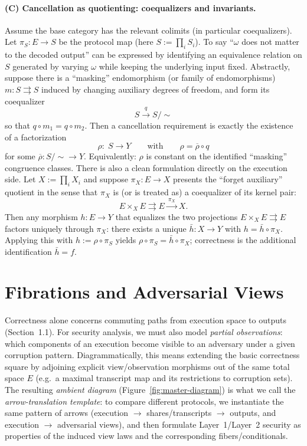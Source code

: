 \documentclass[11pt,a4paper]{article}
\theoremstyle{definition}
\theoremstyle{plain}
\begin{document}
\paragraph{(C) Cancellation as quotienting: coequalizers and invariants.}
Assume the base category has the relevant colimits (in particular coequalizers).
Let $\pi_S:E\to S$ be the protocol map (here $S:=\prod_i S_i$).
To say ``$\omega$ does not matter to the decoded output'' can be expressed by identifying an equivalence relation on $S$ generated by varying $\omega$ while keeping the underlying input fixed.
Abstractly, suppose there is a ``masking'' endomorphism (or family of endomorphisms) $m:S\rightrightarrows S$ induced by changing auxiliary degrees of freedom, and form its coequalizer
\[
S \xrightarrow{q} S/{\sim}
\]
so that $q\circ m_1=q\circ m_2$.
Then a cancellation requirement is exactly the existence of a factorization
\[
\rho:\; S \longrightarrow Y
\qquad\text{with}\qquad
\rho=\overline{\rho}\circ q
\]
for some $\overline{\rho}:S/{\sim}\to Y$.
Equivalently: $\rho$ is constant on the identified ``masking'' congruence classes.
There is also a clean formulation directly on the execution side.
Let $X:=\prod_i X_i$ and suppose $\pi_X:E\to X$ presents the ``forget auxiliary'' quotient in the sense that $\pi_X$ is (or is treated as) a coequalizer of its kernel pair:
\[
E\times_X E \rightrightarrows E \xrightarrow{\ \pi_X\ } X.
\]
Then any morphism $h:E\to Y$ that equalizes the two projections $E\times_X E\rightrightarrows E$ factors uniquely through $\pi_X$:
there exists a unique $\bar h:X\to Y$ with $h=\bar h\circ \pi_X$.
Applying this with $h:=\rho\circ \pi_S$ yields $\rho\circ\pi_S=\bar h\circ \pi_X$; correctness is the additional identification $\bar h=f$.

\section{Fibrations and Adversarial Views}

Correctness alone concerns commuting paths from execution space to outputs (Section~1.1). For security analysis, we must also model \emph{partial observations}: which components of an execution become visible to an adversary under a given corruption pattern. Diagrammatically, this means extending the basic correctness square by adjoining explicit view/observation morphisms out of the same total space $E$ (e.g.\ a maximal transcript map and its restrictions to corruption sets). The resulting \emph{ambient diagram} (Figure~\ref{fig:master-diagram}) is what we call the \emph{arrow-translation template}: to compare different protocols, we instantiate the same pattern of arrows (execution $\to$ shares/transcripts $\to$ outputs, and execution $\to$ adversarial views), and then formulate Layer~1/Layer~2 security as properties of the induced view laws and the corresponding fibers/conditionals.
\end{document}
